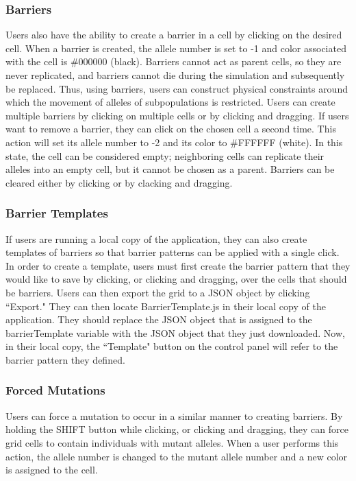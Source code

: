 \documentclass[12pt]{article}
\begin{document}
\begin{spacing}{1.6}
\subsubsection{Barriers}
Users also have the ability to create a barrier in a cell by clicking on the desired cell. When a barrier is created, the allele number is set to -1 and color associated with the cell is \#000000 (black). Barriers cannot act as parent cells, so they are never replicated, and barriers cannot die during the simulation and subsequently be replaced. Thus, using barriers, users can construct physical constraints around which the movement of alleles of subpopulations is restricted. Users can create multiple barriers by clicking on multiple cells or by clicking and dragging. If users want to remove a barrier, they can click on the chosen cell a second time. This action will set its allele number to -2 and its color to \#FFFFFF (white). In this state, the cell can be considered empty; neighboring cells can replicate their alleles into an empty cell, but it cannot be chosen as a parent. Barriers can be cleared either by clicking or by clacking and dragging.

\subsubsection{Barrier Templates}
If users are running a local copy of the application, they can also create templates of barriers so that barrier patterns can be applied with a single click. In order to create a template, users must first create the barrier pattern that they would like to save by clicking, or clicking and dragging, over the cells that should be barriers. Users can then export the grid to a JSON object by clicking ``Export." They can then locate BarrierTemplate.js in their local copy of the application. They should replace the JSON object that is assigned to the barrierTemplate variable with the JSON object that they just downloaded. Now, in their local copy, the ``Template" button on the control panel will refer to the barrier pattern they defined.

\subsubsection{Forced Mutations}
Users can force a mutation to occur in a similar manner to creating barriers. By holding the SHIFT button while clicking, or clicking and dragging, they can force grid cells to contain individuals with mutant alleles. When a user performs this action, the allele number is changed to the mutant allele number and a new color is assigned to the cell.


\end{spacing}
\end{document}
